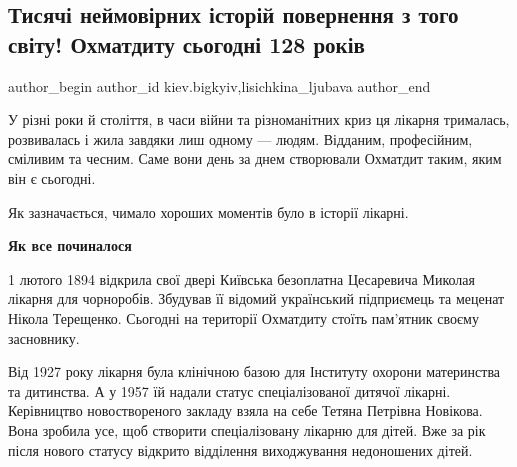 
 
 
 
 
 
\subsection{Тисячі неймовірних історій повернення з того світу! Охматдиту сьогодні 128 років}
\label{sec:01_02_2022.stz.kiev.bigkyiv.1.ohmatdet}
 
\ifcmt
 author_begin
   author_id kiev.bigkyiv,lisichkіna_ljubava
 author_end
\fi

\begin{zznagolos}
У різні роки й століття, в часи війни та різноманітних криз ця лікарня
трималась, розвивалась і жила завдяки лиш одному — людям. Відданим,
професійним, сміливим та чесним. Саме вони день за днем створювали Охматдит
таким, яким він є сьогодні.
\end{zznagolos}

Як зазначається, чимало хороших  моментів було в  історії лікарні.
 
\textbf{Як все починалося}
 
1 лютого 1894 відкрила свої двері Київська безоплатна Цесаревича Миколая
лікарня для чорноробів. Збудував її відомий український підприємець та меценат
Нікола Терещенко. Сьогодні на території Охматдиту стоїть пам’ятник своєму
засновнику.


Від 1927 року лікарня була клінічною базою для Інституту охорони материнства та
дитинства. А у 1957 їй надали статус спеціалізованої дитячої лікарні.
Керівництво новоствореного закладу взяла на себе Тетяна Петрівна Новікова. Вона
зробила усе, щоб створити спеціалізовану лікарню для дітей. Вже за рік після
нового статусу відкрито відділення виходжування недоношених дітей.
 

